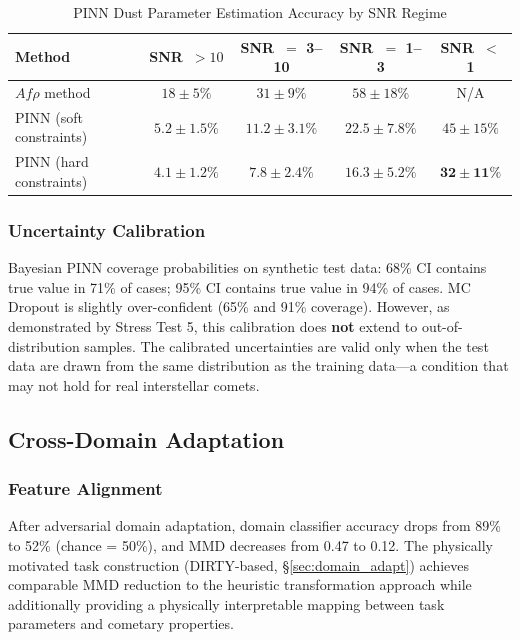 \documentclass[usenatbib]{mnras}
\newcommand{\tablecomments}[1]{\vspace{4pt}{\footnotesize #1}\vspace{2pt}}
\begin{document}
\begin{table}
\centering
\caption{PINN Dust Parameter Estimation Accuracy by SNR Regime}\label{tab:pin_perf}
\begin{tabular}{lcccc}
\toprule
Method & SNR~$>10$ & SNR~$=$ 3--10 & SNR~$=$ 1--3 & SNR~$<$ 1 \\
\midrule
$Af\rho$ method & $18 \pm 5\%$ & $31 \pm 9\%$ & $58 \pm 18\%$ & N/A \\
PINN (soft constraints) & $5.2 \pm 1.5\%$ & $11.2 \pm 3.1\%$ & $22.5 \pm 7.8\%$ & $45 \pm 15\%$ \\
PINN (hard constraints) & $\mathbf{4.1 \pm 1.2\%}$ & $\mathbf{7.8 \pm 2.4\%}$ & $\mathbf{16.3 \pm 5.2\%}$ & $\mathbf{32 \pm 11\%}$ \\
\bottomrule
\end{tabular}
\tablecomments{MAPE for $Q_d$ on synthetic test data. ``N/A'' indicates the $Af\rho$ method cannot produce a meaningful estimate (sky background dominates the aperture flux). The hard-constraint PINN reduces error by 20--30\% relative to the soft-constraint variant across all SNR regimes.}
\end{table}


\subsubsection{Uncertainty Calibration}

Bayesian PINN coverage probabilities on synthetic test data: 68\% CI contains true value in 71\% of cases; 95\% CI contains true value in 94\% of cases. MC Dropout is slightly over-confident (65\% and 91\% coverage). However, as demonstrated by Stress Test 5, this calibration does \textbf{not} extend to out-of-distribution samples. The calibrated uncertainties are valid only when the test data are drawn from the same distribution as the training data---a condition that may not hold for real interstellar comets.

\subsection{Cross-Domain Adaptation}

\subsubsection{Feature Alignment}

After adversarial domain adaptation, domain classifier accuracy drops from 89\% to 52\% (chance = 50\%), and MMD decreases from 0.47 to 0.12. The physically motivated task construction (DIRTY-based, \S\ref{sec:domain_adapt}) achieves comparable MMD reduction to the heuristic transformation approach while additionally providing a physically interpretable mapping between task parameters and cometary properties.
\end{document}
